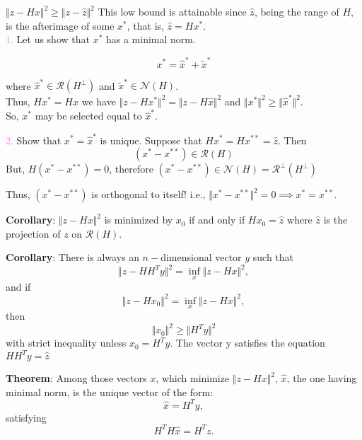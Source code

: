 \documentclass[aspectratio=169]{beamer}
\begin{document}
\begin{frame}{}  %
	
	$\Vert z- Hx \Vert^2 \geq  \Vert z - \hat{z} \Vert^2$ This low bound is attainable since $\hat{z}$, being the range of $H$, is the afterimage of some $x^\ast$, that is, $\hat{z}= H x^\ast$.\\
	\vspace*{5mm}
	\textcolor{violet}{1.} Let us show that $x^\ast$ has a minimal norm.
	
	\[ x^\ast = \hat{x}^\ast + \tilde{x}^\ast \]
	
	\noindent where $\hat{x}^\ast \in \mathcal{R}(H^\perp)$ and $\tilde{x}^\ast \in \mathcal{N}(H)$.\\
	\vspace*{5mm}	
	Thus, $H x^\ast = H\hat{x}$ we have $\Vert z- Hx^\ast \Vert^2 = \Vert z- H \hat{x} \Vert^2$ and $\Vert x^\ast \Vert^2 \geq \Vert \hat{x}^\ast \Vert^2 $.\\
	\vspace*{5mm}
	{\color{violet} So, $x^\ast$ may be selected equal to $\hat{x}^\ast.$ }
\end{frame}

\begin{frame}{} %
	

	\textcolor{violet}{2.} Show that $x^\ast = \hat{x}^\ast$ is unique. Suppose that $H x^\ast = H x^{\ast\ast}= \hat{z}$. Then
	\[ (x^\ast - x^{\ast\ast} ) \in \mathcal{R}(H) \]
	But, $H(x^\ast - x^{\ast\ast} ) = 0$, therefore $ (x^\ast - x^{\ast\ast} ) \in \mathcal{N}(H) = \mathcal{R^\perp}(H^\perp) $
	
	Thus, $(x^\ast - x^{\ast\ast} )$ is orthogonal to itself! i.e., $\Vert x^\ast  - x^{\ast\ast} \Vert^2 = 0 \implies x^\ast = x^{\ast\ast}. $

\end{frame}

\begin{frame}{}  %
	
	{\color{violet} \textbf{Corollary}:}  $\Vert z - H x \Vert^2$ is minimized by $x_0$ if and only if $H x_0 = \hat{z}$ where $\hat{z}$ is the projection of $z$ on $\mathcal{R}(H)$.
	\vspace*{5mm}
		
	{\color{violet} \textbf{Corollary}:} There is always an $n-$dimensional vector $y$ such that
	\[ \Vert z - H H^T y\Vert^2 = \inf_ x \Vert z - H x \Vert^2,\]
	\noindent and if
	\[ \Vert z - H x_0 \Vert^2 = \inf_ x \Vert z - H x \Vert^2,\]
	\noindent then
	\[ \Vert x_0 \Vert^2 \geq \Vert H^T y\Vert^2\]
	with strict inequality unless $x_0 = H^T y$. The vector y satisfies the equation $H H^T y = \hat{z}$
\end{frame}

\begin{frame}{} %
	
	{\color{violet} \textbf{Theorem}:} Among those vectors $x$, which minimize $\Vert z - H x\Vert^2$, $\hat{x}$, the one having minimal norm, is the unique vector of the form:
	\[\hat{x}= H^Ty,\]
	\noindent satisfying
	\[ H^T H \hat{x} = H^T z. \]
\end{frame}
\end{document}
